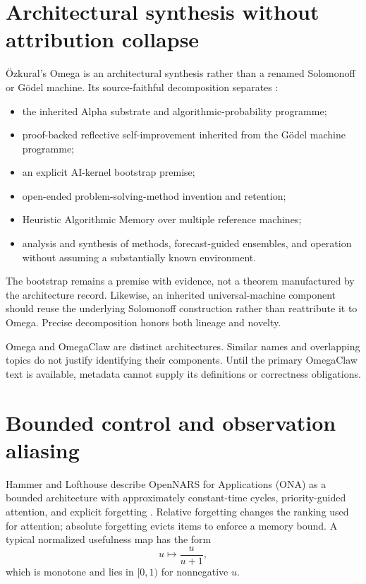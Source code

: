 \documentclass[11pt]{article}
\theoremstyle{remark}
\begin{document}
\section{Architectural synthesis without attribution collapse}

\"Ozkural's Omega is an architectural synthesis rather than a renamed
Solomonoff or G\"odel machine.  Its source-faithful decomposition separates
\cite{ozkuralomega}:
\begin{itemize}
  \item the inherited Alpha substrate and algorithmic-probability programme;
  \item proof-backed reflective self-improvement inherited from the G\"odel
        machine programme;
  \item an explicit AI-kernel bootstrap premise;
  \item open-ended problem-solving-method invention and retention;
  \item Heuristic Algorithmic Memory over multiple reference machines;
  \item analysis and synthesis of methods, forecast-guided ensembles, and
        operation without assuming a substantially known environment.
\end{itemize}
The bootstrap remains a premise with evidence, not a theorem manufactured by
the architecture record.  Likewise, an inherited universal-machine component
should reuse the underlying Solomonoff construction rather than reattribute it
to Omega.  Precise decomposition honors both lineage and novelty.

Omega and OmegaClaw are distinct architectures.  Similar names and overlapping
topics do not justify identifying their components.  Until the primary
OmegaClaw text is available, metadata cannot supply its definitions or
correctness obligations.

\section{Bounded control and observation aliasing}

Hammer and Lofthouse describe OpenNARS for Applications (ONA) as a bounded
architecture with approximately constant-time cycles, priority-guided
attention, and explicit forgetting \cite{hammerlofthouse2020}.  Relative
forgetting changes the ranking used for attention; absolute forgetting evicts
items to enforce a memory bound.  A typical normalized usefulness map has the
form
\[
  u\longmapsto\frac{u}{u+1},
\]
which is monotone and lies in $[0,1)$ for nonnegative $u$.
\end{document}
